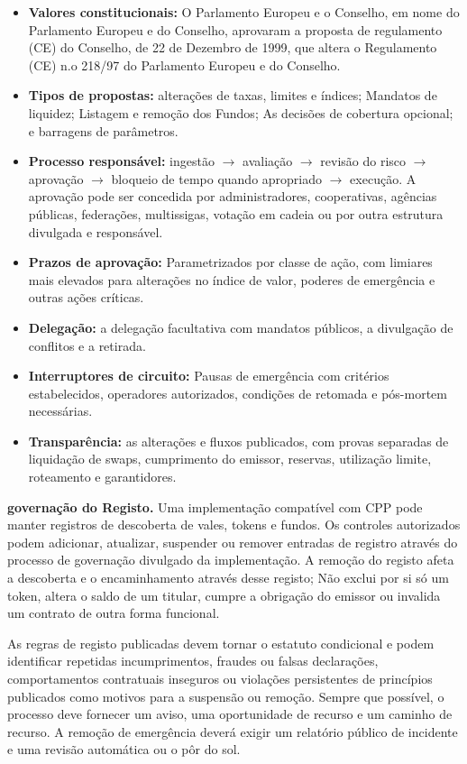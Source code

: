 \documentclass[11pt]{article}
\begin{document}
\begin{itemize}[leftmargin=*]
\item \textbf{Valores constitucionais:} O Parlamento Europeu e o Conselho, em nome do Parlamento Europeu e do Conselho, aprovaram a proposta de regulamento (CE) do Conselho, de 22 de Dezembro de 1999, que altera o Regulamento (CE) n.o 218/97 do Parlamento Europeu e do Conselho.
\item \textbf{Tipos de propostas:} alterações de taxas, limites e índices; Mandatos de liquidez; Listagem e remoção dos Fundos; As decisões de cobertura opcional; e barragens de parâmetros.
\item \textbf{Processo responsável:} ingestão $\to$ avaliação $\to$ revisão do risco $\to$ aprovação $\to$ bloqueio de tempo quando apropriado $\to$ execução. A aprovação pode ser concedida por administradores, cooperativas, agências públicas, federações, multissigas, votação em cadeia ou por outra estrutura divulgada e responsável.
\item \textbf{Prazos de aprovação:} Parametrizados por classe de ação, com limiares mais elevados para alterações no índice de valor, poderes de emergência e outras ações críticas.
\item \textbf{Delegação:} a delegação facultativa com mandatos públicos, a divulgação de conflitos e a retirada.
\item \textbf{Interruptores de circuito:} Pausas de emergência com critérios estabelecidos, operadores autorizados, condições de retomada e pós-mortem necessárias.
\item \textbf{Transparência:} as alterações e fluxos publicados, com provas separadas de liquidação de swaps, cumprimento do emissor, reservas, utilização limite, roteamento e garantidores.
\end{itemize}
\textbf{governação do Registo.} Uma implementação compatível com CPP pode manter registros de descoberta de vales, tokens e fundos. Os controles autorizados podem adicionar, atualizar, suspender ou remover entradas de registro através do processo de governação divulgado da implementação. A remoção do registo afeta a descoberta e o encaminhamento através desse registo; Não exclui por si só um token, altera o saldo de um titular, cumpre a obrigação do emissor ou invalida um contrato de outra forma funcional.

As regras de registo publicadas devem tornar o estatuto condicional e podem identificar repetidas incumprimentos, fraudes ou falsas declarações, comportamentos contratuais inseguros ou violações persistentes de princípios publicados como motivos para a suspensão ou remoção. Sempre que possível, o processo deve fornecer um aviso, uma oportunidade de recurso e um caminho de recurso. A remoção de emergência deverá exigir um relatório público de incidente e uma revisão automática ou o pôr do sol.
\end{document}
